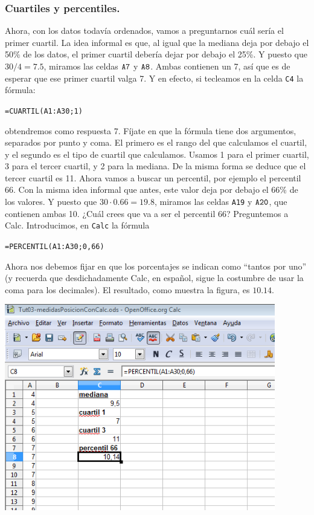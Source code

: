 \documentclass[10pt,a4paper]{article}\usepackage[]{graphicx}\usepackage[]{color}
\newcounter {cont01}
\begin{document}
\subsubsection*{Cuartiles y percentiles.}
\label{tut01:subsubsec:CuartilesPercentiles}


Ahora, con los datos todavía ordenados, vamos a preguntarnos cuál sería el primer cuartil. La idea informal es que, al igual que la mediana deja por debajo el 50\% de los datos, el primer cuartil debería dejar por debajo el 25\%. Y puesto que $30/4=7.5$, miramos las celdas $\tt A7$ y $\tt A8$. Ambas contienen un 7, así que es de esperar que ese primer cuartil valga 7. Y en efecto, si tecleamos en la celda {\tt C4} la fórmula:
\begin{center}
{\tt =CUARTIL(A1:A30;1)}
\end{center}
obtendremos como respuesta 7. Fíjate en que la fórmula tiene dos argumentos, separados por punto y coma. El primero es el rango del que calculamos el cuartil, y el segundo es el tipo de cuartil que calculamos. Usamos 1 para el primer cuartil, 3 para el tercer cuartil, y 2 para la mediana.
De la misma forma se deduce que el tercer cuartil es 11. Ahora vamos a buscar un percentil, por ejemplo el percentil 66. Con la misma idea informal que antes, este valor deja por debajo el 66\% de los valores. Y puesto que $30\cdot 0.66=19.8$, miramos las celdas {\tt A19} y ${\tt A20}$, que contienen ambas 10. ¿Cuál crees que va a ser el percentil 66? Preguntemos a Calc. Introducimos, en {\tt Calc} la fórmula
\begin{center}
{\tt =PERCENTIL(A1:A30;0,66)}
\end{center}
Ahora nos debemos fijar en que los porcentajes se indican como ``tantos por uno'' (y recuerda que desdichadamente Calc, en español, sigue la costumbre de usar la coma para los decimales). El resultado, como muestra la figura, es $10.14$.
    \begin{center}
    \includegraphics[height=9cm]{../fig/Tut03-03.png}
    \end{center}
\end{document}
